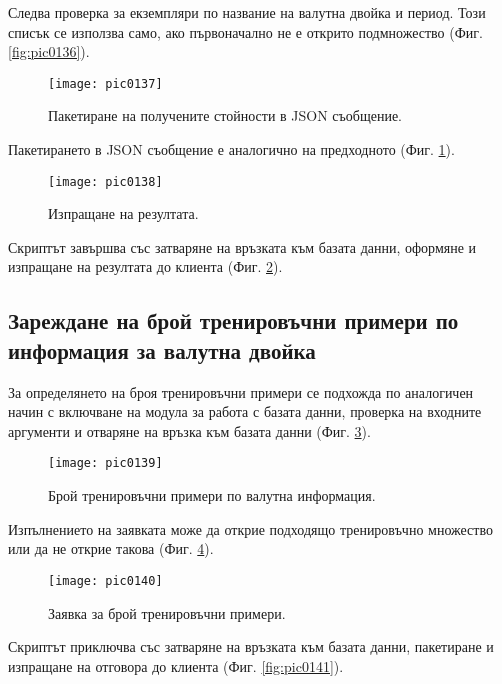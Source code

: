 Следва проверка за екземпляри по название на валутна двойка и период. Този списък се използва само, ако първоначално не е открито подмножество (Фиг. \ref{fig:pic0136}).

\begin{figure}[h]
  \centering
  \texttt{[image: pic0137]}
  \caption{Пакетиране на получените стойности в JSON съобщение.}
\label{fig:pic0137}
\end{figure}
\FloatBarrier

Пакетирането в JSON съобщение е аналогично на предходното (Фиг. \ref{fig:pic0137}).

\begin{figure}[h]
  \centering
  \texttt{[image: pic0138]}
  \caption{Изпращане на резултата.}
\label{fig:pic0138}
\end{figure}
\FloatBarrier

Скриптът завършва със затваряне на връзката към базата данни, оформяне и изпращане на резултата до клиента (Фиг. \ref{fig:pic0138}).

\subsection{Зареждане на брой тренировъчни примери по информация за валутна двойка}

За определянето на броя тренировъчни примери се подхожда по аналогичен начин с включване на модула за работа с базата данни, проверка на входните аргументи и отваряне на връзка към базата данни (Фиг. \ref{fig:pic0139}). 

\begin{figure}[h]
  \centering
  \texttt{[image: pic0139]}
  \caption{Брой тренировъчни примери по валутна информация.}
\label{fig:pic0139}
\end{figure}
\FloatBarrier

Изпълнението на заявката може да открие подходящо тренировъчно множество или да не открие такова (Фиг. \ref{fig:pic0140}). 

\begin{figure}[h]
  \centering
  \texttt{[image: pic0140]}
  \caption{Заявка за брой тренировъчни примери.}
\label{fig:pic0140}
\end{figure}
\FloatBarrier

Скриптът приключва със затваряне на връзката към базата данни, пакетиране и изпращане на отговора до клиента (Фиг. \ref{fig:pic0141}).

